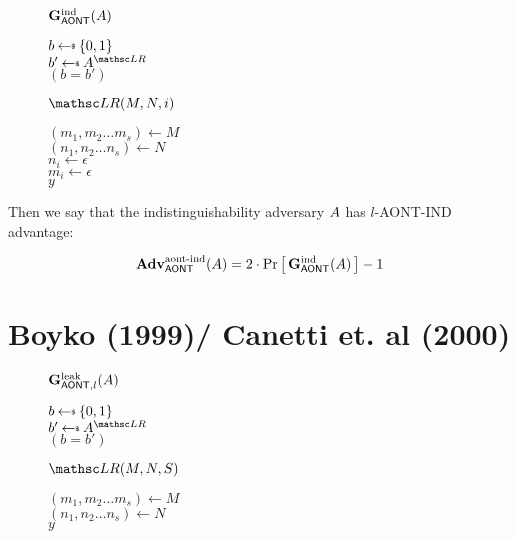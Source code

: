 \documentclass[11pt,twoside]{article}
\begin{document}
\begin{figure}[H]
{
\underline{$\mathbf{G}_{\mathsf{AONT}}^\text{ind}(A)$}

\begin{algorithm}[H]
$b \getsr \bits$\\
$b' \getsr \advA^{\LRO}$\\
\Return $(b=b')$
\end{algorithm}

\smallskip
\underline{$\LRO(M,N,i)$}

\begin{algorithm}[H]
$(m_1,m_2\dots m_s)\gets M$\\
$(n_1,n_2\dots n_s)\gets N$\\
$n_i\gets \epsilon$\\
$m_i\gets \epsilon$\\
\Return $y$
\end{algorithm}
}
\end{figure}

Then we say that the indistinguishability adversary $A$ has $l$-AONT-IND advantage: 

$$\textbf{Adv}^\text{aont-ind}_\mathsf{AONT}(A)=2\cdot{\Pr\left[\,{\mathbf{G}_{\mathsf{AONT}}^\text{ind}(A)}\,\right]} - 1$$

\section{Boyko (1999)/ Canetti et. al (2000)}

\begin{figure}[H]
{
\underline{$\mathbf{G}_{\mathsf{AONT},l}^\text{leak}(A)$}

\begin{algorithm}[H]
$b \getsr \bits$\\
$b' \getsr \advA^{\LRO}$\\
\Return $(b=b')$
\end{algorithm}

\smallskip
\underline{$\LRO(M,N,S)$}

\begin{algorithm}[H]
$(m_1,m_2\dots m_s)\gets M$\\
$(n_1,n_2\dots n_s)\gets N$\\
\Return $y$
\end{algorithm}
}
\end{figure}
\end{document}
